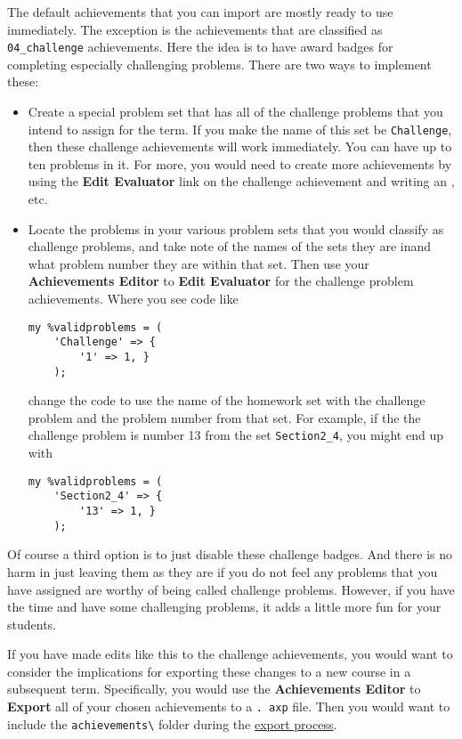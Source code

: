 \documentclass[12pt]{article}
\newcommand{\menu}[1]{\textbf{#1}}
\begin{document}
The default achievements that you can import are mostly ready to use immediately.
The exception is the achievements that are classified as \verb=04_challenge= achievements.
Here the idea is to have award badges for completing especially challenging problems.
There are two ways to implement these: \begin{itemize} \item Create a special problem set that has all of the challenge problems that you intend to assign for the term.
	      If you make the name of this set be \texttt{Challenge}, then these challenge achievements will work immediately.
	      You can have up to ten problems in it.
	      For more, you would need to create more achievements by using the \menu{Edit Evaluator} link on the  challenge achievement and writing an , etc.
	\item Locate the problems in your various problem sets that you would classify as challenge problems, and take note of the names of the sets they are inand what problem number they are within that set.
	      Then use your \menu{Achievements Editor} to \menu{Edit Evaluator} for the challenge problem achievements.
	      Where you see code like \begin{verbatim}
my %validproblems = (
	'Challenge' => {
	    '1' => 1, }
	);
	\end{verbatim} change the code to use the name of the homework set with the challenge problem and the problem number from that set.
	      For example, if the the challenge problem is number 13 from the set \verb=Section2_4=, you might end up with \begin{verbatim}
my %validproblems = (
	'Section2_4' => {
	    '13' => 1, }
	);
	\end{verbatim} \end{itemize} 

Of course a third option is to just disable these challenge badges.
And there is no harm in just leaving them as they are if you do not feel any problems that you have assigned are worthy of being called challenge problems.
However, if you have the time and have some challenging problems, it adds a little more fun for your students.

If you have made edits like this to the challenge achievements, you would want to consider the implications for exporting these changes to a new course in a subsequent term.
Specifically, you would use the \menu{Achievements Editor} to \menu{Export} all of your chosen achievements to a \texttt{.
	axp} file.
Then you would want to include the \texttt{achievements\textbackslash} folder during the \hyperref[exp]{export process}.
\end{document}
